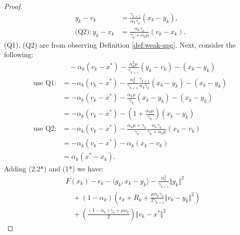 \documentclass[12pt]{article}
\begin{document}
\begin{proof}
{\begin{align*}
            y_k - v_k &= 
            \frac{\gamma_{k + 1}}{\alpha_k \gamma_k}(x_k - y_k),
            \\
            \text{(Q2)}: 
            y_k - x_k &= 
            \frac{\alpha_k \gamma_k}{\gamma_k + \alpha_k \mu}(v_k - x_k). 
        \end{align*}
        }
        (Q1), (Q2) are from observing Definition \ref*{def:weak-apg}. 
        Next, consider the following: 
        \begin{align*}
            &\quad  - \alpha_k(v_k - x^*) - \frac{\alpha_k^2 \mu}{\gamma_{k + 1}}(y_k - v_k) - (x_k - y_k)
            \\
            \text{use Q1}: & =
            -\alpha_k(v_k - x^*) -
            \frac{\alpha_k^2}{\gamma_{k + 1}}\frac{\gamma_{k + 1}}{\alpha_k \gamma_k}(x_k - y_k)
            - (x_k - y_k) 
            \\
            &= 
            -\alpha_k(v_k - x^*) -
            \frac{\alpha_k \mu}{\gamma_k}(x_k - y_k)
            - (x_k - y_k) 
            \\
            &= 
            -\alpha_k(v_k - x^*) -
            \left(
                1 + \frac{\alpha_k \mu}{\gamma_k}
            \right)(x_k - y_k)
            \\
            \text{use Q2}: 
            &= 
            -\alpha_k(v_k - x^*) - 
            \frac{\alpha_k \mu + \gamma_k}{\gamma_k}
            \frac{\alpha_k \gamma_k}{\gamma_k + \alpha_k \mu}(x_k - v_k)
            \\
            &= 
            -\alpha_k(v_k - x^*)
            - \alpha_k(x_k - v_k)
            \\
            &= \alpha_k(x^* - x_k). 
            \tag{Q3}
        \end{align*}
        Adding (2.2*) and (1*) we have: 
        \begin{align*}
            &
            F(x_k) - \epsilon_k - \langle  g_k, x_k - y_k\rangle
            - \frac{\alpha_k^2}{\gamma_{k + 1}}\Vert g_k\Vert^2
            \\
            &\quad 
                + (1 - \alpha_k)
                \left(
                    \epsilon_k + R_k + 
                    \frac{\mu\alpha_k\gamma_k}{2\gamma_{k + 1}}
                    \Vert v_k - y_k\Vert^2
                \right)
            \\
            &\quad 
                + 
                \left(
                \frac{(1 - \alpha_k)\gamma_k + \mu \alpha_k}{2} 
                \right)\Vert v_k - x^*\Vert^2

\end{align*}
\end{proof}
\end{document}
